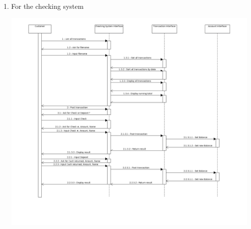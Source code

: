 \documentclass[12pt,letterpaper]{article}
\begin{document}
\begin{enumerate}
    \item For the checking system

      \includegraphics[width=\textwidth]{hw1_part3.png}
  \end{enumerate}
\end{document}
